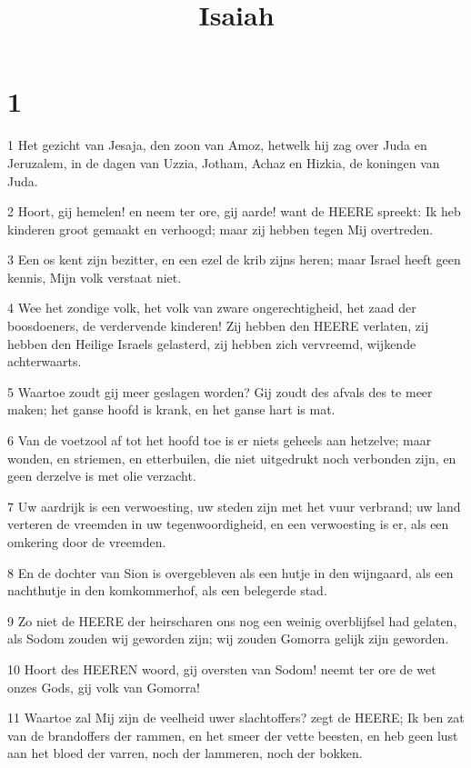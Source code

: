 

\title{Isaiah}



\chapter{1}

\par 1 Het gezicht van Jesaja, den zoon van Amoz, hetwelk hij zag over Juda en Jeruzalem, in de dagen van Uzzia, Jotham, Achaz en Hizkia, de koningen van Juda.
\par 2 Hoort, gij hemelen! en neem ter ore, gij aarde! want de HEERE spreekt: Ik heb kinderen groot gemaakt en verhoogd; maar zij hebben tegen Mij overtreden.
\par 3 Een os kent zijn bezitter, en een ezel de krib zijns heren; maar Israel heeft geen kennis, Mijn volk verstaat niet.
\par 4 Wee het zondige volk, het volk van zware ongerechtigheid, het zaad der boosdoeners, de verdervende kinderen! Zij hebben den HEERE verlaten, zij hebben den Heilige Israels gelasterd, zij hebben zich vervreemd, wijkende achterwaarts.
\par 5 Waartoe zoudt gij meer geslagen worden? Gij zoudt des afvals des te meer maken; het ganse hoofd is krank, en het ganse hart is mat.
\par 6 Van de voetzool af tot het hoofd toe is er niets geheels aan hetzelve; maar wonden, en striemen, en etterbuilen, die niet uitgedrukt noch verbonden zijn, en geen derzelve is met olie verzacht.
\par 7 Uw aardrijk is een verwoesting, uw steden zijn met het vuur verbrand; uw land verteren de vreemden in uw tegenwoordigheid, en een verwoesting is er, als een omkering door de vreemden.
\par 8 En de dochter van Sion is overgebleven als een hutje in den wijngaard, als een nachthutje in den komkommerhof, als een belegerde stad.
\par 9 Zo niet de HEERE der heirscharen ons nog een weinig overblijfsel had gelaten, als Sodom zouden wij geworden zijn; wij zouden Gomorra gelijk zijn geworden.
\par 10 Hoort des HEEREN woord, gij oversten van Sodom! neemt ter ore de wet onzes Gods, gij volk van Gomorra!
\par 11 Waartoe zal Mij zijn de veelheid uwer slachtoffers? zegt de HEERE; Ik ben zat van de brandoffers der rammen, en het smeer der vette beesten, en heb geen lust aan het bloed der varren, noch der lammeren, noch der bokken.
